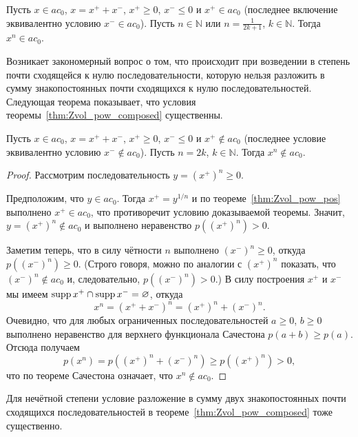 \begin{theorem}
	\label{thm:Zvol_pow_composed}
	Пусть $x\in ac_0$, $x = x^+ +x^-$, $x^+\geq 0$, $x^- \leq 0$ и $x^+ \in ac_0$
	(последнее включение эквивалентно условию $x^- \in ac_0$).
	Пусть $n\in\mathbb{N}$ или $n = \frac1{2k+1}$, $k\in\mathbb{N}$.
	Тогда $x^n \in ac_0$.
\end{theorem}

Возникает закономерный вопрос о том, что происходит при возведении в степень почти сходящейся к нулю последовательности,
которую нельзя разложить в сумму знакопостоянных почти сходящихся к нулю последовательностей.
Следующая теорема показывает, что условия теоремы~\ref{thm:Zvol_pow_composed} существенны.

\begin{theorem}
	\label{thm:ac0_pow_even}
	Пусть $x\in ac_0$, $x = x^+ +x^-$, $x^+\geq 0$, $x^- \leq 0$ и $x^+ \notin ac_0$
	(последнее условие эквивалентно условию $x^- \notin ac_0$).
	Пусть $n = 2k$, $k\in\mathbb{N}$.
	Тогда $x^n \notin ac_0$.
\end{theorem}

\begin{proof}
	Рассмотрим последовательность $y = (x^+)^n \geq 0$.

	Предположим, что $y \in ac_0$.
	Тогда $x^+ = y^{1/n}$ и по теореме~\ref{thm:Zvol_pow_pos} выполнено $x^+\in ac_0$,
	что противоречит условию доказываемой теоремы.
	Значит, $y = (x^+)^n \notin ac_0$ и выполнено неравенство $p\left((x^+)^n\right) > 0$.

	Заметим теперь, что  в силу чётности $n$ выполнено $(x^-)^n \geq 0$, откуда $p\left((x^-)^n\right) \geq 0$.
	(Строго говоря, можно по аналогии с $(x^+)^n$ показать, что $(x^-)^n\notin ac_0$ и, следовательно, $p\left((x^-)^n\right) > 0$.)
	В силу построения $x^+$ и $x^-$ мы имеем $\operatorname{supp} x^+ \cap \operatorname{supp} x^- = \varnothing$,
	откуда
	\begin{equation}
		x^n = (x^+ + x^-)^n = (x^+)^n + (x^-)^n
		.
	\end{equation}
	Очевидно, что для любых ограниченных последовательностей $a\geq0$, $b\geq 0$ выполнено неравенство для верхнего функционала Сачестона $p(a+b) \geq p(a)$.
	Отсюда получаем
	\begin{equation}
		p(x^n) = p\left((x^+)^n + (x^-)^n\right) \geq p\left((x^+)^n\right) > 0
		,
	\end{equation}
	что по теореме Сачестона означает, что $x^n \notin ac_0$.
\end{proof}

Для нечётной степени условие разложение в сумму двух знакопостоянных почти сходящихся последовательностей в теореме~\ref{thm:Zvol_pow_composed} тоже существенно.

